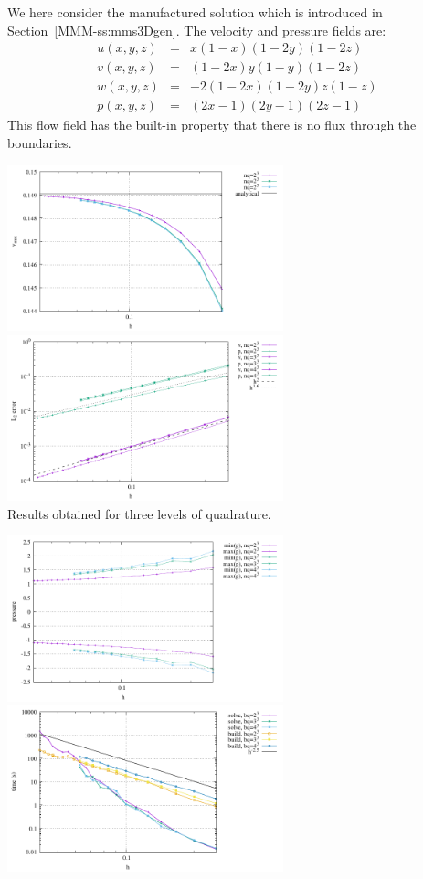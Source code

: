 We here consider the manufactured solution which is introduced in Section~\ref{MMM-ss:mms3Dgen}.
The velocity and pressure fields are:
\begin{eqnarray}
u(x,y,z) &=& x(1-x)(1-2y)(1-2z)\\
v(x,y,z) &=& (1-2x) y(1-y) (1-2z) \\
w(x,y,z) &=& -2(1-2x)(1-2y)z(1-z) \\
p(x,y,z) &=& (2x-1)(2y-1)(2z-1)
\end{eqnarray}
This flow field has the built-in property that there is no flux through the 
boundaries.

\begin{center}
\includegraphics[width=8cm]{python_codes/fieldstone_82/results/bench5/vrms.pdf}
\includegraphics[width=8cm]{python_codes/fieldstone_82/results/bench5/conv.pdf}\\
{\captionfont Results obtained for three levels of quadrature.}
\end{center}


\begin{center}
\includegraphics[width=8cm]{python_codes/fieldstone_82/results/bench5/p_stats.pdf}
\includegraphics[width=8cm]{python_codes/fieldstone_82/results/bench5/times.pdf}
\end{center}

